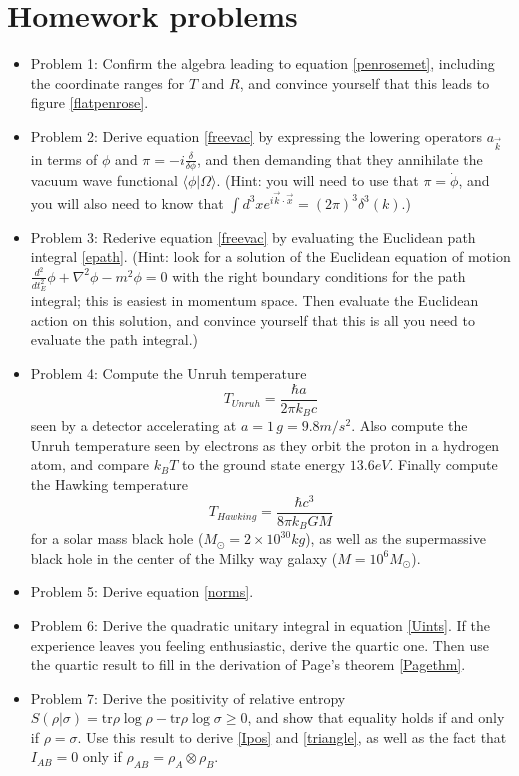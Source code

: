 \documentclass[12pt]{article}
\newcommand{\be}{\begin{equation}}
\newcommand{\ee}{\end{equation}}
\newcommand{\lan}{\langle}
\newcommand{\ran}{\rangle}
\begin{document}
\section{Homework problems}
\begin{itemize}
\item Problem 1: Confirm the algebra leading to equation \eqref{penrosemet}, including the coordinate ranges for $T$ and $R$, and convince yourself that this leads to figure \ref{flatpenrose}.
\item Problem 2: Derive equation \eqref{freevac} by expressing the lowering operators $a_{\vec{k}}$ in terms of $\phi$ and $\pi=-i\frac{\delta}{\delta\phi}$, and then demanding that they annihilate the vacuum wave functional $\lan \phi|\Omega\ran$. (Hint: you will need to use that $\pi=\dot{\phi}$, and you will also need to know that $\int d^3x e^{i \vec{k}\cdot \vec{x}}=(2\pi)^3 \delta^3(k)$.)
\item Problem 3: Rederive equation \eqref{freevac} by evaluating the Euclidean path integral \eqref{epath}.  (Hint: look for a solution of the Euclidean equation of motion $\frac{d^2}{dt_E^2}\phi+\nabla^2\phi-m^2\phi=0$ with the right boundary conditions for the path integral; this is easiest in momentum space.  Then evaluate the Euclidean action on this solution, and convince yourself that this is all you need to evaluate the path integral.)
\item Problem 4: Compute the Unruh temperature
\be
T_{Unruh}=\frac{\hbar a}{2\pi k_B c}
\ee
 seen by a detector accelerating at $a=1\,g =9.8 m/s^2$.  Also compute the Unruh temperature seen by electrons as they orbit the proton in a hydrogen atom, and compare $k_B T$ to the ground state energy $13.6eV$.  Finally compute the Hawking temperature 
\be
T_{Hawking}=\frac{\hbar c^3}{8\pi k_B G M}
\ee
for a solar mass black hole ($M_\odot=2 \times 10^{30} kg$), as well as the supermassive black hole in the center of the Milky way galaxy ($M=10^6 M_\odot$).
\item Problem 5: Derive equation \eqref{norms}.
\item Problem 6: Derive the quadratic unitary integral in equation \eqref{Uints}.  If the experience leaves you feeling enthusiastic, derive the quartic one.  Then use the quartic result to fill in the derivation of Page's theorem \eqref{Pagethm}.
\item Problem 7: Derive the positivity of relative entropy $S(\rho|\sigma)=\mathrm{tr} \rho \log \rho-\mathrm{tr} \rho \log \sigma\geq 0$, and show that equality holds if and only if $\rho=\sigma$.  Use this result to derive \eqref{Ipos} and \eqref{triangle}, as well as the fact that $I_{AB}=0$ only if $\rho_{AB}=\rho_A\otimes\rho_B$.

\end{itemize}
\end{document}
